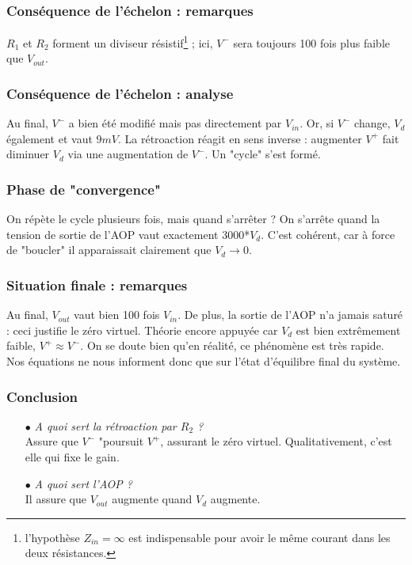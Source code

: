 		\subsubsection{Conséquence de l'échelon : remarques}
		$R_1$ et $R_2$ forment un diviseur résistif\footnote{l'hypothèse $Z_{in} = 
		\infty$ est indispensable pour avoir le même courant dans les deux 
		résistances.} ; ici, $V^-$ sera toujours 100 fois plus faible que 
		$V_{out}$.
		
		\subsubsection{Conséquence de l'échelon : analyse}
		Au final, $V^-$ a bien été modifié mais pas directement par $V_{in}$. 
		Or, si $V^-$ change, $V_d$ également et vaut $9mV$. La rétroaction 
		réagit en sens inverse : augmenter $V^+$ fait diminuer $V_d$ via une 
		augmentation de $V^-$. Un "cycle" s'est formé.
		
		\subsubsection{Phase de "convergence"}
		On répète le cycle plusieurs fois, mais quand s’arrêter ? On 
		s'arrête quand la tension de sortie de l'AOP vaut exactement 
		3000*$V_d$. C'est cohérent, car à force de "boucler" il apparaissait 
		clairement que $V_d \rightarrow 0$.
		
		\subsubsection{Situation finale : remarques}
		Au final, $V_{out}$ vaut bien 100 fois $V_{in}$. De plus, la sortie 
		de l'AOP n'a jamais saturé : ceci justifie le zéro virtuel. Théorie 
		encore appuyée car $V_d$ est bien extrêmement faible, $V^+\approx 
		V^-$. On se doute bien qu'en réalité, ce phénomène est très rapide. 
		Nos équations ne nous informent donc que sur l'état d'équilibre 
		final du système.
		
		\subsubsection{Conclusion}
		\begin{itemize}
		\item[$\bullet$] \textit{A quoi sert la rétroaction par $R_2$ ?}\\
		Assure que $V^-$ "poursuit $V^+$, assurant le zéro virtuel. 
		Qualitativement, c'est elle qui fixe le gain.
		\item[$\bullet$] \textit{A quoi sert l'AOP ?}		\\
		Il assure que $V_{out}$ augmente quand $V_d$ augmente.
		\end{itemize}


